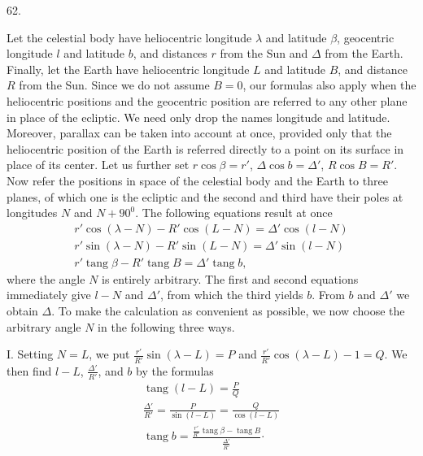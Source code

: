 \par{}\medskip
\hypertarget{native-081-article062}{}
\begin{center}62.\end{center}
Let the celestial body have heliocentric longitude $\lambda$ and latitude $\beta$, geocentric longitude $l$ and latitude $b$, and distances $r$ from the Sun and $\Delta$ from the Earth. Finally, let the Earth have heliocentric longitude $L$ and latitude $B$, and distance $R$ from the Sun. Since we do not assume $B=0$, our formulas also apply when the heliocentric positions and the geocentric position are referred to any other plane in place of the ecliptic. We need only drop the names longitude and latitude. Moreover, parallax can be taken into account at once, provided only that the heliocentric position of the Earth is referred directly to a point on its surface in place of its center. Let us further set $r\cos\beta=r'$, $\Delta\cos b=\Delta'$, $R\cos B=R'$. Now refer the positions in space of the celestial body and the Earth to three planes, of which one is the ecliptic and the second and third have their poles at longitudes $N$ and $N+90^0$. The following equations result at once
\[
\begin{gathered}
r'\cos(\lambda-N)-R'\cos(L-N)=\Delta'\cos(l-N)\\
r'\sin(\lambda-N)-R'\sin(L-N)=\Delta'\sin(l-N)\\
r'\operatorname{tang}\beta-R'\operatorname{tang}B=\Delta'\operatorname{tang}b,
\end{gathered}
\]
where the angle $N$ is entirely arbitrary. The first and second equations immediately give $l-N$ and $\Delta'$, from which the third yields $b$. From $b$ and $\Delta'$ we obtain $\Delta$. To make the calculation as convenient as possible, we now choose the arbitrary angle $N$ in the following three ways.

I. Setting $N=L$, we put $\frac{r'}{R'}\sin(\lambda-L)=P$ and $\frac{r'}{R'}\cos(\lambda-L)-1=Q$. We then find $l-L$, $\frac{\Delta'}{R'}$, and $b$ by the formulas
\[
\begin{gathered}
\operatorname{tang}(l-L)=\frac{P}{Q}\\[.5em]
\frac{\Delta'}{R'}=\frac{P}{\sin(l-L)}=\frac{Q}{\cos(l-L)}\\[.5em]
\operatorname{tang}b=\frac{\frac{r'}{R'}\operatorname{tang}\beta-\operatorname{tang}B}{\frac{\Delta'}{R'}}\mathord{\cdot}
\end{gathered}
\]

